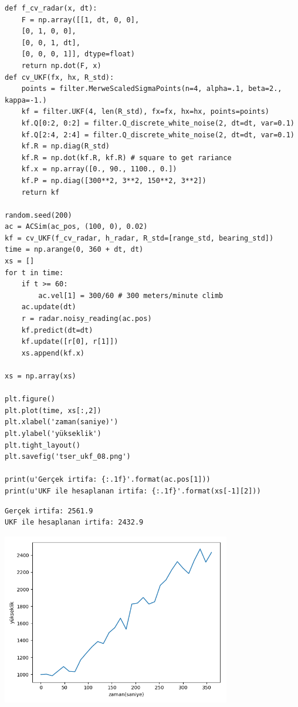 \documentclass[12pt,fleqn]{article}\usepackage{../../common}
\begin{document}
\begin{verbatim}
def f_cv_radar(x, dt):
    F = np.array([[1, dt, 0, 0],
    [0, 1, 0, 0],
    [0, 0, 1, dt],
    [0, 0, 0, 1]], dtype=float)
    return np.dot(F, x)
def cv_UKF(fx, hx, R_std):
    points = filter.MerweScaledSigmaPoints(n=4, alpha=.1, beta=2., kappa=-1.)
    kf = filter.UKF(4, len(R_std), fx=fx, hx=hx, points=points)
    kf.Q[0:2, 0:2] = filter.Q_discrete_white_noise(2, dt=dt, var=0.1)
    kf.Q[2:4, 2:4] = filter.Q_discrete_white_noise(2, dt=dt, var=0.1)
    kf.R = np.diag(R_std)
    kf.R = np.dot(kf.R, kf.R) # square to get rariance
    kf.x = np.array([0., 90., 1100., 0.])
    kf.P = np.diag([300**2, 3**2, 150**2, 3**2])
    return kf

random.seed(200)
ac = ACSim(ac_pos, (100, 0), 0.02)
kf = cv_UKF(f_cv_radar, h_radar, R_std=[range_std, bearing_std])
time = np.arange(0, 360 + dt, dt)
xs = []
for t in time:
    if t >= 60:
        ac.vel[1] = 300/60 # 300 meters/minute climb
    ac.update(dt)
    r = radar.noisy_reading(ac.pos)
    kf.predict(dt=dt)
    kf.update([r[0], r[1]])
    xs.append(kf.x)

xs = np.array(xs)

plt.figure()
plt.plot(time, xs[:,2])
plt.xlabel('zaman(saniye)')
plt.ylabel('yükseklik')
plt.tight_layout()
plt.savefig('tser_ukf_08.png')
    
print(u'Gerçek irtifa: {:.1f}'.format(ac.pos[1]))
print(u'UKF ile hesaplanan irtifa: {:.1f}'.format(xs[-1][2]))
\end{verbatim}

\begin{verbatim}
Gerçek irtifa: 2561.9
UKF ile hesaplanan irtifa: 2432.9
\end{verbatim}

\includegraphics[width=10cm]{tser_ukf_08.png}
\end{document}
